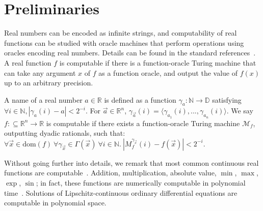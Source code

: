 \documentclass{llncs}
\newcommand{\dom}{\mathrm{dom}}
\begin{document}
\section{Preliminaries}
Real numbers can be encoded as infinite strings, and computability of real functions can be studied with oracle machines that perform operations using oracles encoding real numbers. Details can be found in the standard references~\cite{CAbook,Kobook,vasco}. A real function $f$ is computable if there is a function-oracle Turing machine that can take any argument $x$ of $f$ as a function oracle, and output the value of $f(x)$ up to an arbitrary precision. 
\begin{definition}
A name of a real number $a\in \mathbb{R}$ is defined as a function $\mathcal{\gamma}_a: \mathbb{N}\rightarrow \mathbb{D}$ satisfying $\forall i\in \mathbb{N}, |\gamma_a(i) - a|<2^{-i}.$
For $\vec a\in \mathbb{R}^n$, $\gamma_{\vec a}(i) = \langle \gamma_{a_1}(i), ..., \gamma_{a_n}(i)\rangle$.  We say $f:\subseteq\mathbb{R}^n\rightarrow \mathbb{R}$ is computable if there exists a function-oracle Turing machine $\mathcal{M}_f$, outputting dyadic rationals, such that: 
$\forall \vec x \in \dom(f)\ \forall \gamma_{\vec x}\in \Gamma(\vec x)\ \forall i \in \mathbb{N}.\ |M_f^{\gamma_{\vec x}}(i) - f(\vec x)|<2^{-i}.$
\end{definition}
Without going further into details, we remark that most common continuous real functions are computable~\cite{CAbook}. Addition, multiplication, absolute value, $\min$, $\max$, $\exp$, $\sin$; in fact, these functions are numerically computable in polynomial time~\cite{}. Solutions of Lipschitz-continuous ordinary differential equations are computable in polynomial space. 
\end{document}
